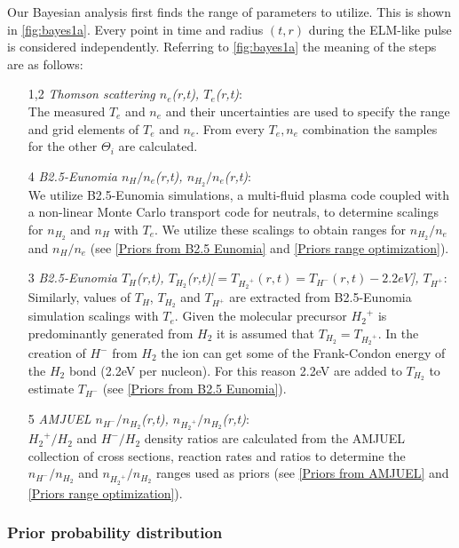 Our Bayesian analysis first finds the range of parameters to utilize. This is shown in \autoref{fig:bayes1a}. Every point in time and radius $(t,r)$ during the ELM-like pulse is considered independently. Referring to \autoref{fig:bayes1a} the meaning of the steps are as follows:
\begin{enumerate}
    \item[1,2] \emph{Thomson scattering $n_e$(r,t), $T_e$(r,t)}: \\The measured $T_e$ and $n_e$ and their uncertainties are used to specify the range and grid elements of $T_e$ and $n_e$. From every $T_e,n_e$ combination the samples for the other $\Theta_i$ are calculated.
    \item[4] \emph{B2.5-Eunomia $n_H/n_e$(r,t), $n_{H_2}/n_e$(r,t)}: \\ We utilize B2.5-Eunomia simulations, a multi-fluid plasma code coupled with a non-linear Monte Carlo transport code for neutrals\cite{Wieggers2013,Chandra2021,Chandra2022}, to determine scalings for $n_{H_2}$ and $n_H$ with $T_e$. We utilize these scalings to obtain ranges for $n_{H_2}/n_e$ and $n_H/n_e$ (see \autoref{Priors from B2.5 Eunomia} and \ref{Priors range optimization}).
    \item[3] \emph{B2.5-Eunomia $T_H$(r,t), $T_{H_2}$(r,t)[$=T_{{H_2}^+}(r,t)=T_{H^-}(r,t)-2.2eV$], $T_{H^+}$}: \\Similarly, values of $T_H$, $T_{H_2}$ and $T_{H^+}$ are extracted from B2.5-Eunomia simulation scalings with $T_e$. Given the molecular precursor ${H_2}^+$ is predominantly generated from $H_2$ it is assumed that $T_{H_2}=T_{{H_2}^+}$. In the creation of $H^-$ from $H_2$ the ion can get some of the Frank-Condon energy of the $H_2$ bond (2.2eV per nucleon). For this reason 2.2eV are added to $T_{H_2}$ to estimate $T_{H^-}$\cite{Verhaegh2020} (see \autoref{Priors from B2.5 Eunomia}).
    \item[5] \emph{AMJUEL $n_{H^-}/n_{H_2}$(r,t), $n_{{H_2}^+}/n_{H_2}$(r,t)}: \\${H_2}^+/H_2$ and $H^-/H_2$ density ratios are calculated from the AMJUEL collection of cross sections, reaction rates and ratios \cite{Reiter2017,Reiter2005,Kotov2007} to determine the $n_{H^-}/n_{H_2}$ and $n_{{H_2}^+}/n_{H_2}$ ranges used as priors (see \autoref{Priors from AMJUEL} and \ref{Priors range optimization}).
\end{enumerate}

\subsubsection{Prior probability distribution}\label{Prior probability distribution}

